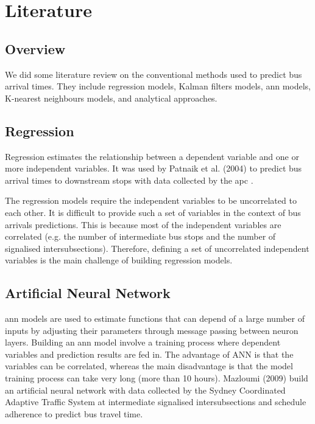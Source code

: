 \section{Literature}

\subsection{Overview}
\par We did some literature review on the conventional methods used to predict bus arrival times. They include regression models, Kalman filters models, \acrfull{ann} models, K-nearest neighbours models, and analytical approaches.

\subsection{Regression}
\par Regression estimates the relationship between a dependent variable and one or more independent variables. It was used by Patnaik et al. (2004) to predict bus arrival times to downstream stops with data collected by the \acrfull{apc} \cite{regression_models}.

\par The regression models require the independent variables to be uncorrelated to each other. It is difficult to provide such a set of variables in the context of bus arrivals predictions. This is because most of the independent variables are correlated (e.g. the number of intermediate bus stops and the number of signalised intersubsections). Therefore, defining a set of uncorrelated independent variables is the main challenge of building regression models.

\subsection{Artificial Neural Network}
\par \acrshort{ann} models are used to estimate functions that can depend of a large number of inputs by adjusting their parameters through message passing between neuron layers. Building an \acrshort{ann} model involve a training process where dependent variables and prediction results are fed in. The advantage of ANN is that the variables can be correlated, whereas the main disadvantage is that the model training process can take very long (more than 10 hours). Mazloumi (2009) build an artificial neural network with data collected by the Sydney Coordinated Adaptive Traffic System at intermediate signalised intersubsections and schedule adherence to predict bus travel time\cite{ann}.

